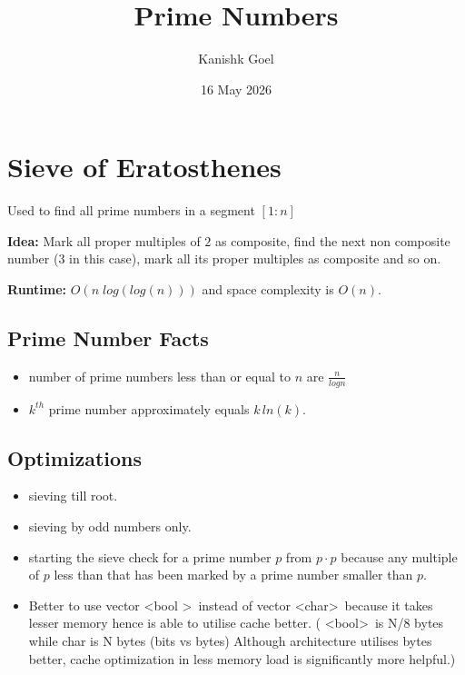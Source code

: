 \documentclass{article}
\title{Prime Numbers}
\author{Kanishk Goel}
\date{16 May 2026}
\begin{document}
	\SetAlgoCaptionSeparator{}
	\renewcommand{\thealgocf}{} 
	\renewcommand{\AlCapNameFnt}{\bfseries}
	\renewcommand{\AlCapFnt}{}
	\DontPrintSemicolon
	\renewcommand{\algorithmcfname}{}
	\maketitle
	\SetAlgoNoEnd
	
	\section{Sieve of Eratosthenes}
	Used to find all prime numbers in a segment $[1:n]$ \newline
	
	\textbf{Idea:} Mark all proper multiples of $2$ as composite, find the next non composite number ($3$ in this case), mark all its proper multiples as composite and so on. \newline
	
	\textbf{Runtime:} $O(n \; log (log (n)))$ and space complexity is $O(n)$.
	
	\subsection{Prime Number Facts}
		\begin{itemize}
			\item number of prime numbers less than or equal to $n$ are $\frac{n}{logn}$
			\item $k^{th}$ prime number approximately equals $k \, {ln(k)}$. 
		\end{itemize}
		
	\subsection{Optimizations}
		\begin{itemize}
			\item sieving till root.
			\item sieving by odd numbers only.
			\item starting the sieve check for a prime number $p$ from $p \cdot p$ because any multiple of $p$ less than that has been marked by a prime number smaller than $p$.
			\item Better to use vector \textless bool \textgreater \, instead of vector \textless char\textgreater \, because it takes lesser memory hence is able to utilise cache better. ( \textless bool\textgreater \, is N/8 bytes while char is N bytes (bits vs bytes) Although architecture utilises bytes better, cache optimization in less memory load is significantly more helpful.)
		\end{itemize}
	\newpage
\end{document}
